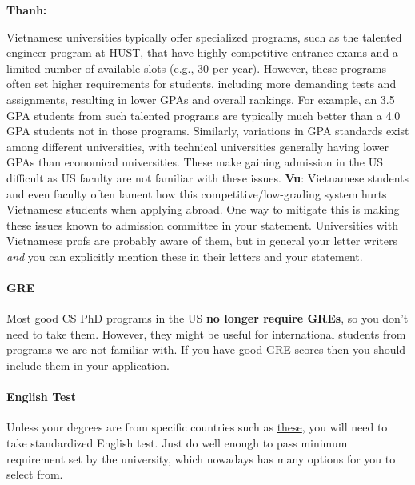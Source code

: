 \documentclass[11pt]{article}
\newenvironment{commentbox}[1][]{
\small
    \begin{cbox}
    \textbf{#1} 
 }{
   \end{cbox}
}
\begin{document}
\begin{commentbox}[Thanh:]
Vietnamese universities typically offer specialized programs, such as the talented engineer program at HUST, that have highly competitive entrance exams and a limited number of available slots (e.g., 30 per year). However, these programs often set higher requirements for students, including more demanding tests and assignments, resulting in lower GPAs and overall rankings. For example, an 3.5 GPA students from such talented programs are typically much better than a 4.0 GPA students not in those programs.  Similarly, variations in GPA standards exist among different universities, with technical universities generally having lower GPAs than economical universities. These make gaining admission in the US difficult as US faculty are not familiar with these issues.
\tcblower
\textbf{Vu}: Vietnamese students and even faculty often lament how this competitive/low-grading system hurts Vietnamese students when applying abroad. One way to mitigate this is making these issues known to admission committee in your statement.  Universities with Vietnamese profs are probably aware of them, but in general your letter writers \emph{and} you can explicitly mention these in their letters and your statement.
\end{commentbox}

\paragraph{GRE} Most good CS PhD programs in the US \textbf{no longer require GREs}, so you don't need to take them. However, they might be useful for international students from programs we are not familiar with.  If you have good GRE scores then you should include them in your application.

\paragraph{English Test} Unless your degrees are from specific countries such as \href{https://github.com/dynaroars/dynaroars.github.io/wiki/About-GMU#standard-tests-waiver-eligible-countries}{these}, you will need to
take standardized English test. Just do well enough to pass minimum requirement set by the university, which nowadays has many options for you to select from.
\end{document}
